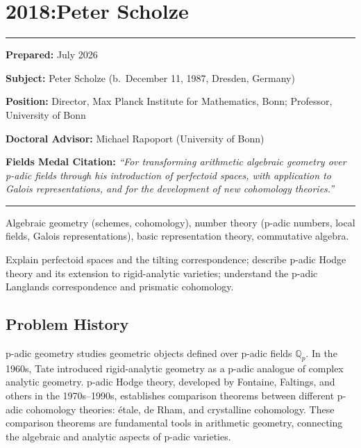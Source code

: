 \chapter{2018:Peter Scholze}\label{ch2018peterscholze:peter-scholze-fields-medal-2018-a-comprehensive-report-on-his-work-and-impact}

\begin{center}\rule{0.5\linewidth}{0.5pt}\end{center}

\textbf{Prepared:} July 2026

\textbf{Subject:} Peter Scholze (b.\ December 11, 1987, Dresden, Germany)

\textbf{Position:} Director, Max Planck Institute for Mathematics, Bonn; Professor, University of Bonn

\textbf{Doctoral Advisor:} Michael Rapoport (University of Bonn)

\textbf{Fields Medal Citation:} \emph{``For transforming arithmetic algebraic geometry over p-adic fields through his introduction of perfectoid spaces, with application to Galois representations, and for the development of new cohomology theories.''}

\begin{center}\rule{0.5\linewidth}{0.5pt}\end{center}

\begin{prereqs}
Algebraic geometry (schemes, cohomology), number theory (p-adic numbers, local fields, Galois representations), basic representation theory, commutative algebra.
\end{prereqs}

\begin{objectives}
Explain perfectoid spaces and the tilting correspondence; describe p-adic Hodge theory and its extension to rigid-analytic varieties; understand the p-adic Langlands correspondence and prismatic cohomology.
\end{objectives}

\section{Problem History}

p-adic geometry studies geometric objects defined over p-adic fields $\mathbb{Q}_p$. In the 1960s, Tate introduced rigid-analytic geometry as a p-adic analogue of complex analytic geometry. p-adic Hodge theory, developed by Fontaine, Faltings, and others in the 1970s--1990s, establishes comparison theorems between different p-adic cohomology theories: \'{e}tale, de Rham, and crystalline cohomology. These comparison theorems are fundamental tools in arithmetic geometry, connecting the algebraic and analytic aspects of p-adic varieties.

